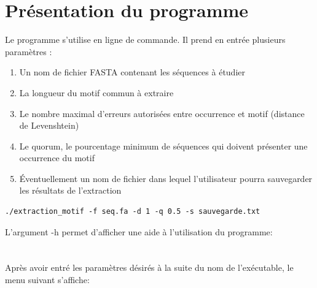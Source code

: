 \documentclass[a4paper,12pt]{article}
\author{Jennifer Rondineau}
\begin{document}
 
\renewcommand{\contentsname}{Sommaire} 
\tableofcontents{} %
\clearpage
\lstset{language=bash, basicstyle=\small\ttfamily, breaklines,prebreak= , postbreak= , frame=shadowbox}

\section{Présentation du programme}

Le programme s'utilise en ligne de commande. Il prend en entrée plusieurs paramètres : 
\begin{enumerate}
\setlength{\itemsep}{1pt}
\setlength{\parskip}{0pt}
\setlength{\parsep}{0pt}
\item Un nom de fichier FASTA contenant les séquences à étudier
\item La longueur du motif commun à extraire
\item Le nombre maximal d'erreurs autorisées entre occurrence et motif (distance de Levenshtein)
\item Le quorum, le pourcentage minimum de séquences qui doivent présenter une occurrence du motif
\item Éventuellement un nom de fichier dans lequel l'utilisateur pourra sauvegarder les résultats de l'extraction
\end{enumerate}

\begin{lstlisting}
./extraction_motif -f seq.fa -d 1 -q 0.5 -s sauvegarde.txt
\end{lstlisting}

\vspace{1cm}
L'argument -h permet d'afficher une aide à l'utilisation du programme: \\
\vspace{0.2cm} \\
\\[1cm]
Après avoir entré les paramètres désirés à la suite du nom de l’exécutable, le menu suivant s'affiche:  \\
\vspace{0.2cm} \\
\\
\end{document}
